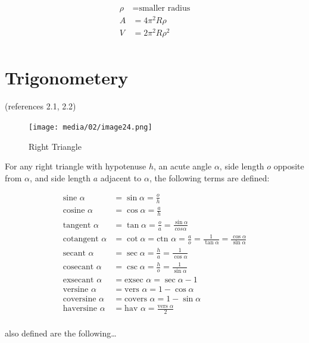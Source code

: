 \documentclass[
]{book}
\begin{document}
\begin{align}
\rho &= \text{smaller radius} \\
A &= 4 \pi ^2 R \rho \\
V &= 2 \pi ^2 R \rho^2 \\
\end{align}

\hypertarget{trigonometery}{%
\section{Trigonometery}\label{trigonometery}}

(references 2.1, 2.2)

\begin{figure}
\centering
\texttt{[image: media/02/image24.png]}
\caption{Right Triangle}
\end{figure}

For any right triangle with hypotenuse \(h\), an acute angle \(\alpha\), side length \(o\) opposite from \(\alpha\), and side length \(a\) adjacent to \(\alpha\), the following terms are defined:

\begin{align}
\text{sine } \alpha &= \sin{\alpha} = \frac{o}{h} \\
\text{cosine } \alpha &= \cos{\alpha} = \frac{a}{h} \\
\text{tangent } \alpha &= \tan{\alpha} = \frac{o}{a} = \frac{\sin{\alpha}}{cos{\alpha}} \\
\text{cotangent } \alpha &= \cot{\alpha} = \text{ctn } \alpha = \frac{a}{o} = \frac{1}{\tan{\alpha}} = \frac{\cos{\alpha}}{\sin{\alpha}} \\
\text{secant } \alpha &= \sec{\alpha} = \frac{h}{a} = \frac{1}{\cos{\alpha}} \\
\text{cosecant } \alpha &= \csc{\alpha} = \frac{h}{o} = \frac{1}{\sin{\alpha}} \\
\text{exsecant } \alpha &= \text{exsec } \alpha = \sec{\alpha} - 1 \\
\text{versine } \alpha &= \text{vers } \alpha = 1 - \cos{\alpha} \\
\text{coversine } \alpha &= \text{covers } \alpha = 1 - \sin{\alpha} \\
\text{haversine } \alpha &= \text{hav } \alpha = \frac{\text{vers } \alpha}{2} \\
\end{align}

also defined are the following\ldots{}
\end{document}
